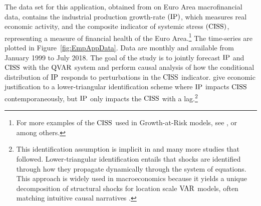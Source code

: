 The data set for this application, obtained from  \citet{chavleishvili2024forecasting} on Euro Area macrofinancial data, contains the industrial production growth-rate $(\operatorname{IP})$, which measures real economic activity, and the composite indicator of systemic stress $(\operatorname{CISS})$, representing a measure of financial health of the Euro Area.\footnote{For more examples of the $\operatorname{CISS}$ used in Growth-at-Risk models, see \citet{figueres2020vulnerable}, \citet{szendrei2023revisiting} or \citet{varga2025non} among others.} The time-series are plotted in Figure~\ref{fig:EmpAppData}. Data are monthly and available from January 1999 to July 2018. The goal of the study is to jointly forecast $\operatorname{IP}$ and $\operatorname{CISS}$ with the $\operatorname{QVAR}$ system and perform causal analysis of how the conditional distribution of $\operatorname{IP}$ responds to perturbations in the $\operatorname{CISS}$ indicator.
%
\citet{chavleishvili2024forecasting} give economic justification to a lower-triangular identification scheme where $\operatorname{IP}$ impacts $\operatorname{CISS}$ contemporaneously, but $\operatorname{IP}$ only impacts the $\operatorname{CISS}$ with a lag.\footnote{This identification assumption is implicit in \citet{adrian2019vulnerable} and many more studies that followed. Lower‐triangular identification entails that shocks are identified through how they propagate dynamically through the system of equations. This approach is widely used in macroeconomics because it yields a unique decomposition of structural shocks for location scale $\operatorname{VAR}$ models, often matching intuitive causal narratives \citep{sims1980macroeconomics}. } %


